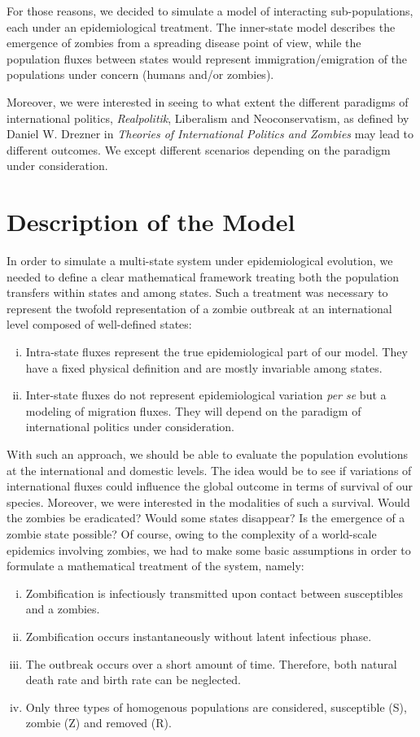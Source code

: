 \documentclass[11pt]{article} %
\begin{document}
For those reasons, we decided to simulate a model of interacting sub-populations, each under an epidemiological treatment. The inner-state model describes the emergence of zombies from a spreading disease point of view, while the population fluxes between states would represent immigration/emigration of the populations under concern (humans and/or zombies). 

Moreover, we were interested in seeing to what extent the different paradigms of international politics, \textit{Realpolitik}, Liberalism and Neoconservatism, as defined by Daniel W. Drezner in \textit{Theories of International Politics and Zombies} \cite{drezner} may lead to different outcomes. We except different scenarios depending on the paradigm under consideration. 

\newpage
\section{Description of the Model}\indent

In order to simulate a multi-state system under epidemiological evolution, we needed to define a clear mathematical framework treating both the population transfers within states and among states. Such a treatment was necessary to represent the twofold representation of a zombie outbreak at an international level composed of well-defined states:
\begin{enumerate}[i.]
	\item Intra-state fluxes represent the true epidemiological part of our model. They have a fixed physical definition and are mostly invariable among states.
	\item Inter-state fluxes do not represent epidemiological variation \textit{per se} but a modeling of migration fluxes. They will depend on the paradigm of international politics under consideration. 
\end{enumerate}

With such an approach, we should be able to evaluate the population evolutions at the international and domestic levels. The idea would be to see if variations of international fluxes could influence the global outcome in terms of survival of our species. Moreover, we were interested in the modalities of such a survival. Would the zombies be eradicated? Would some states disappear? Is the emergence of a zombie state possible? Of course, owing to the complexity of a world-scale epidemics involving zombies, we had to make some basic assumptions in order to formulate a mathematical treatment of the system, namely:
\begin{enumerate}[i.]
	\item Zombification is infectiously transmitted upon contact between susceptibles and a zombies.
	\item Zombification occurs instantaneously without latent infectious phase.
	\item The outbreak occurs over a short amount of time. Therefore, both natural death rate and birth rate can be neglected.
	\item Only three types of homogenous populations are considered, susceptible (S), zombie (Z) and removed (R).
\end{enumerate}
\end{document}
